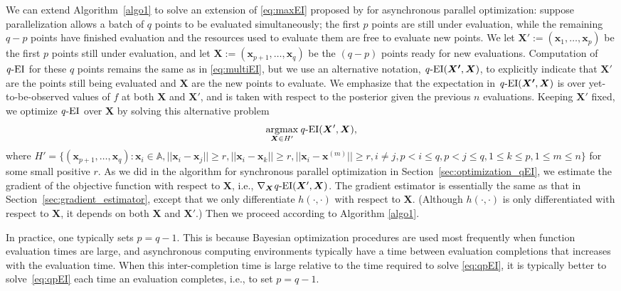 \documentclass[paper=letter]{scrartcl}
\newcommand{\argmax}{\operatornamewithlimits{argmax}}
\newcommand{\qEI}{\text{\textit q-EI}}
\begin{document}
We can extend Algorithm~\ref{algo1} to solve an extension of 
\eqref{eq:maxEI}  proposed by \cite{ginsbourger2010kriging} for 
asynchronous parallel optimization: suppose parallelization
allows a batch of $q$ points to be evaluated simultaneously; the first $p$ points are
still under evaluation, while the remaining $q-p$ points have finished evaluation and the resources used to evaluate them are free to evaluate new points. We let $\bm{X'} := (\bm{x}_1, \ldots, \bm{x}_p)$ be the first
$p$ points still under evaluation, and let $\bm{X}:=(\bm{x}_{p+1}, \ldots, \bm{x}_q)$
be the $(q-p)$ points ready for new evaluations. Computation of $\qEI$ for these $q$ points 
remains the same as in \eqref{eq:multiEI},
but we use an alternative notation, 
$\qEI(\bm{X'}, \bm{X})$, to explicitly indicate that $\bm{X}'$ are the points still being evaluated and $\bm{X}$ are the new points to evaluate. 
We emphasize that the expectation in $\qEI(\bm{X'},\bm{X})$ is over yet-to-be-observed values of $f$ at both $\mathbf{X}$ and $\mathbf{X'}$, and is taken with respect to the posterior given the previous $n$ evaluations.
Keeping $\bm{X}'$ fixed, we optimize $\qEI$ over $\bm{X}$ by
solving this alternative problem
\begin{equation} \label{eq:qpEI}
\argmax_{\bm{X} \in H'} \qEI (\bm{X}', \bm{X}),
\end{equation}
where $H' = \{(\bm{x}_{p+1}, \ldots, \bm{x}_{q}): \bm{x}_i \in \mathbb{A}, \lvert\lvert \bm{x}_i - \bm{x}_j \rvert\rvert \geq r, \lvert\lvert \bm{x}_i - \bm{x}_k \rvert\rvert \geq r, \lvert\lvert \bm{x}_i - \bm{x}^{(m)} \rvert\rvert \geq r, i \neq j, p < i \leq q, p < j \leq q, 1 \leq k \leq p, 1 \leq m \leq n \}$ for some small positive $r$.
As we did in the algorithm for synchronous parallel optimization in Section~\ref{sec:optimization_qEI},
we estimate the gradient of the objective function with respect to $\bm{X}$, i.e., $\nabla_{\bm{X}} \qEI (\bm{X}', \bm{X})$. 
The gradient estimator is essentially the same as that
in Section~\ref{sec:gradient_estimator}, except that we only
differentiate $h(\cdot, \cdot)$ with respect to $\bm{X}$. 
(Although $h(\cdot,\cdot)$ is only differentiated with respect to $\mathbf{X}$, it depends on both $\mathbf{X}$ and $\mathbf{X'}$.)
Then we proceed according to Algorithm \ref{algo1}.

In practice, one typically sets $p=q-1$.
This is because 
Bayesian optimization procedures are used most frequently when function evaluation times are large, 
and asynchronous computing environments 
typically have a time between evaluation completions that increases with the evaluation time.
When this inter-completion time is large relative to the time required to solve \eqref{eq:qpEI}, 
it is typically better to solve~\eqref{eq:qpEI} each time an evaluation completes, i.e., to set $p=q-1$.
\end{document}
